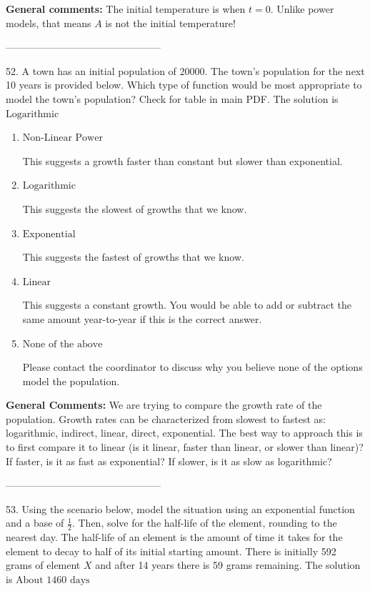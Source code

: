 \documentclass{extbook}[14pt]
\begin{document}
\textbf{General comments:} The initial temperature is when $t = 0$. Unlike power models, that means $A$ is not the initial temperature!

-----------------------------------------------

52. A town has an initial population of 20000. The town's population for the next 10 years is provided below. Which type of function would be most appropriate to model the town's population?
Check for table in main PDF. 
The solution is $ \text{Logarithmic} $ 

\begin{enumerate}[label=\Alph*.] 
\item $ \text{Non-Linear Power} $ 

 This suggests a growth faster than constant but slower than exponential. 
\item $ \text{Logarithmic} $ 

 This suggests the slowest of growths that we know. 
\item $ \text{Exponential} $ 

 This suggests the fastest of growths that we know. 
\item $ \text{Linear} $ 

 This suggests a constant growth. You would be able to add or subtract the same amount year-to-year if this is the correct answer. 
\item $ \text{None of the above} $ 

 Please contact the coordinator to discuss why you believe none of the options model the population. 
\end{enumerate} 
 
\textbf{General Comments:} We are trying to compare the growth rate of the population. Growth rates can be characterized from slowest to fastest as: logarithmic, indirect, linear, direct, exponential. The best way to approach this is to first compare it to linear (is it linear, faster than linear, or slower than linear)? If faster, is it as fast as exponential? If slower, is it as slow as logarithmic?

-----------------------------------------------

53. Using the scenario below, model the situation using an exponential function and a base of $\frac{1}{2}$. Then, solve for the half-life of the element, rounding to the nearest day.
The half-life of an element is the amount of time it takes for the element to decay to half of its initial starting amount. There is initially 592 grams of element $X$ and after 14 years there is 59 grams remaining. 
The solution is $ \text{About } 1460 \text{ days} $ 
\end{document}
